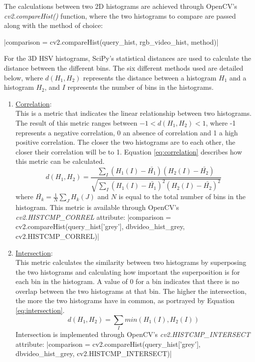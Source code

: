 The calculations between two 2D histograms are achieved through OpenCV's \textit{cv2.compareHist()} function, where the two histograms to compare are passed along with the method of choice:

|comparison = cv2.compareHist(query_hist, rgb_video_hist, method)|

For the 3D HSV histograms, SciPy's statistical distances are used to calculate the distance between the different bins. The six different methods used are detailed below, where $d(H_1, H_2)$ represents the distance between a histogram $H_1$ and a histogram $H_2$, and $I$ represents the number of bins in the histograms.

\begin{enumerate}

    \item \underline{Correlation}:\\
    This is a metric that indicates the linear relationship between two histograms. The result of this metric ranges between $-1 < d(H_1,H_2) < 1$, where -1 represents a negative correlation, 0 an absence of correlation and 1 a high positive correlation. The closer the two histograms are to each other, the closer their correlation will be to 1. Equation \ref{eq:correlation} describes how this metric can be calculated.
    \begin{equation}
    \label{eq:correlation}
        d(H_1,H_2)=\frac{\sum _I(H_1(I)-\bar{H_1})(H_2(I)-\bar{H_2})}{\sqrt{\sum _I(H_1(I)-\bar{H_1})^2(H_2(I)-\bar{H_2})^2}}
    \end{equation}
    where $\bar{H_k}=\frac{1}{N}\sum_JH_k(J)$ and $N$ is equal to the total number of bins in the histogram. This metric is available through OpenCV's \textit{cv2.HISTCMP\_CORREL} attribute:
    |comparison = cv2.compareHist(query_hist['grey'], dbvideo_hist_grey, cv2.HISTCMP_CORREL)|
    
    \item \underline{Intersection}:\\
    This metric calculates the similarity between two histograms by superposing the two histograms and calculating how important the superposition is for each bin in the histogram. A value of 0 for a bin indicates that there is no overlap between the two histograms at that bin. The higher the intersection, the more the two histograms have in common, as portrayed by Equation \ref{eq:intersection}.
    \begin{equation}
    \label{eq:intersection}
        d(H_1,H_2)=\sum_Imin(H_1(I),H_2(I))
    \end{equation}
    Intersection is implemented through OpenCV's \textit{cv2.HISTCMP\_INTERSECT} attribute:
    |comparison = cv2.compareHist(query_hist['grey'], dbvideo_hist_grey, cv2.HISTCMP_INTERSECT)|
    

\end{enumerate}
